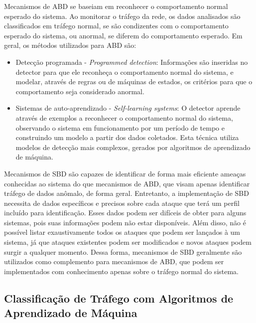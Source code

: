 \documentclass[cic,tc]{iiufrgs}
\begin{document}
Mecanismos de ABD se baseiam em reconhecer o comportamento normal esperado do sistema. Ao monitorar o tráfego da rede, os dados analisados são classificados em tráfego normal, se são condizentes com o comportamento esperado do sistema, ou anormal, se diferem do comportamento esperado. Em geral, os métodos utilizados para ABD são:
\begin{itemize}
\item{Detecção programada - \emph{Programmed detection}}: Informações são inseridas no detector para que ele reconheça o comportamento normal do sistema, e modelar, através de regras ou de máquinas de estados, os critérios para que o comportamento seja considerado anormal.
\item{Sistemas de auto-aprendizado - \emph{Self-learning systems}}: O detector aprende através de exemplos a reconhecer o comportamento normal do sistema, observando o sistema em funcionamento por um período de tempo e construindo um modelo a partir dos dados coletados. Esta técnica utiliza modelos de detecção mais complexos, gerados por algoritmos de aprendizado de máquina. 
\end{itemize}

Mecanismos de SBD são capazes de identificar de forma mais eficiente ameaças conhecidas ao sistema do que mecanismos de ABD, que visam apenas identificar tráfego de dados anômalo, de forma geral. Entretanto, a implementação de SBD necessita de dados específicos e precisos sobre cada ataque que terá um perfil incluído para identificação. Esses dados podem ser difíceis de obter para alguns sistemas, pois suas informações podem não estar disponíveis. Além disso, não é possível listar exaustivamente todos os ataques que podem ser lançados à um sistema, já que ataques existentes podem ser modificados e novos ataques podem surgir a qualquer momento. Dessa forma, mecanismos de SBD geralmente são utilizados como complemento para mecanismos de ABD, que podem ser implementados com conhecimento apenas sobre o tráfego normal do sistema.

\subsection{Classificação de Tráfego com Algoritmos de Aprendizado de Máquina}
\label{mldetection}
\end{document}
